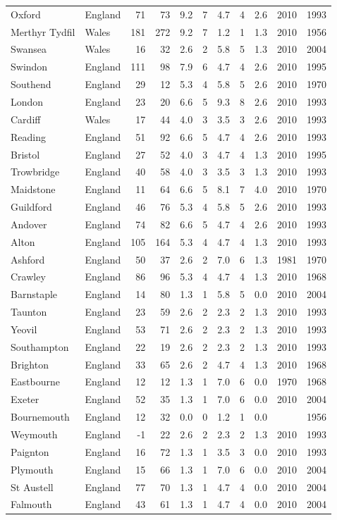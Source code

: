 \documentclass[11pt,a4paper]{article}
\begin{document}
{\begin{longtable}{llrrrrrrrrr}
Oxford & England & 71 & 73 & 9.2 & 7 & 4.7 & 4 & 2.6 & 2010 & 1993\\
Merthyr Tydfil & Wales & 181 & 272 & 9.2 & 7 & 1.2 & 1 & 1.3 & 2010 & 1956\\
Swansea & Wales & 16 & 32 & 2.6 & 2 & 5.8 & 5 & 1.3 & 2010 & 2004\\
Swindon & England & 111 & 98 & 7.9 & 6 & 4.7 & 4 & 2.6 & 2010 & 1995\\
Southend & England & 29 & 12 & 5.3 & 4 & 5.8 & 5 & 2.6 & 2010 & 1970\\
London & England & 23 & 20 & 6.6 & 5 & 9.3 & 8 & 2.6 & 2010 & 1993\\
Cardiff & Wales & 17 & 44 & 4.0 & 3 & 3.5 & 3 & 2.6 & 2010 & 1993\\
Reading & England & 51 & 92 & 6.6 & 5 & 4.7 & 4 & 2.6 & 2010 & 1993\\
Bristol & England & 27 & 52 & 4.0 & 3 & 4.7 & 4 & 1.3 & 2010 & 1995\\
Trowbridge & England & 40 & 58 & 4.0 & 3 & 3.5 & 3 & 1.3 & 2010 & 1993\\
Maidstone & England & 11 & 64 & 6.6 & 5 & 8.1 & 7 & 4.0 & 2010 & 1970\\
Guildford & England & 46 & 76 & 5.3 & 4 & 5.8 & 5 & 2.6 & 2010 & 1993\\
Andover & England & 74 & 82 & 6.6 & 5 & 4.7 & 4 & 2.6 & 2010 & 1993\\
Alton & England & 105 & 164 & 5.3 & 4 & 4.7 & 4 & 1.3 & 2010 & 1993\\
Ashford & England & 50 & 37 & 2.6 & 2 & 7.0 & 6 & 1.3 & 1981 & 1970\\
Crawley & England & 86 & 96 & 5.3 & 4 & 4.7 & 4 & 1.3 & 2010 & 1968\\
Barnstaple & England & 14 & 80 & 1.3 & 1 & 5.8 & 5 & 0.0 & 2010 & 2004\\
Taunton & England & 23 & 59 & 2.6 & 2 & 2.3 & 2 & 1.3 & 2010 & 1993\\
Yeovil & England & 53 & 71 & 2.6 & 2 & 2.3 & 2 & 1.3 & 2010 & 1993\\
Southampton & England & 22 & 19 & 2.6 & 2 & 2.3 & 2 & 1.3 & 2010 & 1993\\
Brighton & England & 33 & 65 & 2.6 & 2 & 4.7 & 4 & 1.3 & 2010 & 1968\\
Eastbourne & England & 12 & 12 & 1.3 & 1 & 7.0 & 6 & 0.0 & 1970 & 1968\\
Exeter & England & 52 & 35 & 1.3 & 1 & 7.0 & 6 & 0.0 & 2010 & 2004\\
Bournemouth & England & 12 & 32 & 0.0 & 0 & 1.2 & 1 & 0.0 &  & 1956\\
Weymouth & England & -1 & 22 & 2.6 & 2 & 2.3 & 2 & 1.3 & 2010 & 1993\\
Paignton & England & 16 & 72 & 1.3 & 1 & 3.5 & 3 & 0.0 & 2010 & 1993\\
Plymouth & England & 15 & 66 & 1.3 & 1 & 7.0 & 6 & 0.0 & 2010 & 2004\\
St Austell & England & 77 & 70 & 1.3 & 1 & 4.7 & 4 & 0.0 & 2010 & 2004\\
Falmouth & England & 43 & 61 & 1.3 & 1 & 4.7 & 4 & 0.0 & 2010 & 2004\\
\bottomrule\end{longtable}}
\end{document}
